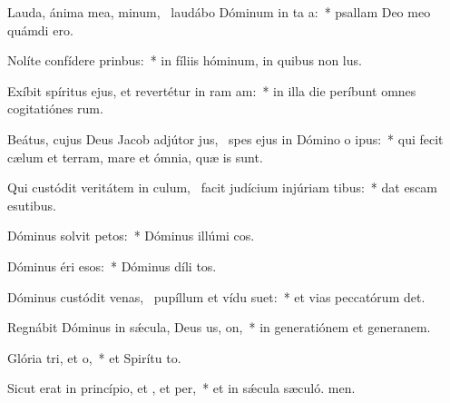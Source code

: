 \item Lauda, ánima mea, minum,~\pscross{} laudábo Dóminum in ta a:~* psallam Deo meo quámdi ero.
\item Nolíte confídere  prinbus:~* in fíliis hóminum, in quibus non  lus.
\item Exíbit spíritus ejus, et revertétur in ram am:~* in illa die períbunt omnes cogitatiónes rum.
\item Beátus, cujus Deus Jacob adjútor jus,~\pscross{} spes ejus in Dómino o ipus:~* qui fecit cælum et terram, mare et ómnia, quæ  is sunt.
\item Qui custódit veritátem in culum,~\pscross{} facit judícium injúriam tibus:~* dat escam esutibus.
\item Dóminus solvit petos:~* Dóminus illúmi cos.
\item Dóminus éri esos:~* Dóminus díli tos.
\item Dóminus custódit venas,~\pscross{} pupíllum et vídu suet:~* et vias peccatórum det.
\item Regnábit Dóminus in sǽcula, Deus us, on,~* in generatiónem et generanem.
\item Glória tri, et o,~* et Spirítu to.
\item Sicut erat in princípio, et , et per,~* et in sǽcula sæculó. men.
